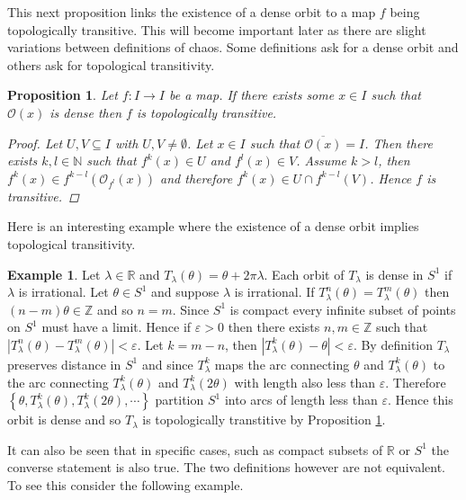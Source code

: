 \documentclass[11pt,a4paper,oneside]{memoir}
\theoremstyle{plain}
\newtheorem{prop}[thm]{Proposition}
\theoremstyle{definition}
\newtheorem{exmp}[thm]{Example}
\begin{document}
This next proposition links the existence of a dense orbit to a map $f$ being topologically transitive. This will become important later as there are slight variations between definitions of chaos. Some definitions ask for a dense orbit and others ask for topological transitivity.

\begin{prop} \label{prop:dense-transitive}
    Let $f: I \to I$ be a map. If there exists some $x \in I$ such that $\mathcal{O}(x)$ is dense then $f$ is topologically transitive.
    \begin{proof}
        Let $U, V \subseteq I$ with $U, V \neq \emptyset$. Let $x \in I$ such that $\overline{\mathcal{O}(x)} = I$. Then there exists $k, l \in \mathbb{N}$ such that $f^k(x) \in U$ and $f^l(x) \in V$. Assume $k > l$, then $f^k(x) \in f^{k - l}\left( \mathcal{O}_{f^l}(x) \right)$ and therefore $f^k(x) \in U \cap f^{k-l}(V)$. Hence $f$ is transitive.
    \end{proof}
\end{prop}

Here is an interesting example where the existence of a dense orbit implies topological transitivity.

\begin{exmp} \label{exmp:s1irrational}
    Let $\lambda \in \mathbb{R}$ and $T_\lambda(\theta) = \theta + 2\pi \lambda$. Each orbit of $T_\lambda$ is dense in $S^1$ if $\lambda$ is irrational. Let $\theta \in S^1$ and suppose $\lambda$ is irrational. If $T_\lambda^n(\theta) = T_\lambda^m(\theta)$ then $(n - m)\theta \in \mathbb{Z}$ and so $n = m$. Since $S^1$ is compact every infinite subset of points on $S^1$ must have a limit. Hence if $\varepsilon > 0$ then there exists $n, m \in \mathbb{Z}$ such that $\left\lvert T_\lambda^n(\theta) - T_\lambda^m(\theta) \right\rvert < \varepsilon$. Let $k = m - n$, then $\left\lvert T_\lambda^k(\theta) - \theta \right\rvert < \varepsilon$. By definition $T_\lambda$ preserves distance in $S^1$ and since $T_\lambda^k$ maps the arc connecting $\theta$ and $T_\lambda^k(\theta)$ to the arc connecting $T_\lambda^k(\theta)$ and $T_\lambda^k(2 \theta)$ with length also less than $\varepsilon$. Therefore $\left\lbrace \theta, T_\lambda^k(\theta), T_\lambda^k(2 \theta), \cdots \right\rbrace$ partition $S^1$ into arcs of length less than $\varepsilon$. Hence this orbit is dense and so $T_\lambda$ is topologically transtitive by Proposition \ref{prop:dense-transitive}.
\end{exmp}

It can also be seen that in specific cases, such as compact subsets of $\mathbb{R}$ or $S^1$ the converse statement is also true. The two definitions however are not equivalent. To see this consider the following example.
\end{document}
